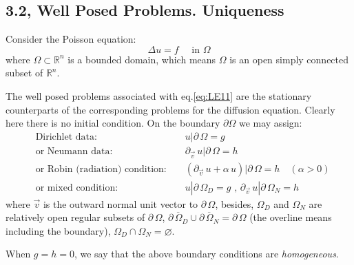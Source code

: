 \documentclass[../main.tex]{subfiles}
\begin{document}
\subsection{3.2, Well Posed Problems. Uniqueness} \label{sec:3.2}

Consider the Poisson equation:
\begin{equation} \label{eq:LE11}
    \Delta u = f \quad \text{ in  } \Omega
\end{equation}
where $\Omega \subset \mathbb{R}^n$ is a bounded domain, which means $\Omega$ is an open simply connected subset of $\mathbb{R}^n$. 

The well posed problems associated with eq.\ref{eq:LE11} are the stationary counterparts of the corresponding problems for the diffusion equation. Clearly here there is no initial condition. On the boundary $\partial \Omega$ we may assign:
\begin{align}
    & \text{Dirichlet data:  } & & u|\partial \, \Omega = g  \label{eq:LE12} \\
    & \text{or Neumann data:  } & & \partial_{\vec{v}} \, u|\partial \, \Omega = h  \label{eq:LE13} \\
    & \text{or Robin (radiation) condition:  } & & (\partial_{\vec{v}} \, u + \alpha \, u)|\partial \, \Omega  = h \quad (\alpha > 0)  \label{eq:LE14} \\
    & \text{or mixed condition:  } & & u|\partial \, \Omega_D = g \text{ ,  } \partial_{\vec{v}} \, u|\partial \, \Omega_N = h \label{eq:LE15}
\end{align}
where $\vec{v}$ is the outward normal unit vector to $\partial \, \Omega$, besides, $\Omega_D$ and $\Omega_N$ are relatively open regular subsets of $\partial \, \Omega$, $\overline{\partial \,\Omega_D} \cup \overline{\partial \,\Omega_N} = \partial \, \Omega$ (the overline means including the boundary), $\Omega_D \cap \Omega_N = \varnothing$.

When $g = h = 0$, we say that the above boundary conditions are \textit{homogeneous}.
\end{document}
